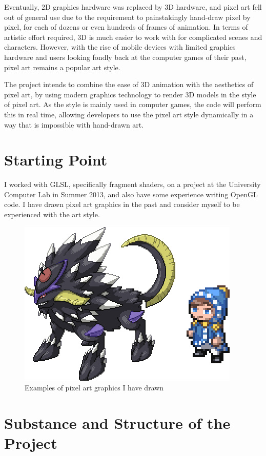 \documentclass[12pt]{article}
\begin{document}
Eventually, 2D graphics hardware was replaced by 3D hardware, and pixel art fell out of general use due to the requirement to painstakingly hand-draw pixel by pixel, for each of dozens or even hundreds of frames of animation. In terms of artistic effort required, 3D is much easier to work with for complicated scenes and characters. However, with the rise of mobile devices with limited graphics hardware and users looking fondly back at the computer games of their past, pixel art remains a popular art style.

The project intends to combine the ease of 3D animation with the aesthetics of pixel art, by using modern graphics technology to render 3D models in the style of pixel art. As the style is mainly used in computer games, the code will perform this in real time, allowing developers to use the pixel art style dynamically in a way that is impossible with hand-drawn art.

\section*{Starting Point}

I worked with GLSL, specifically fragment shaders, on a project at the University Computer Lab in Summer 2013, and also have some experience writing OpenGL code. I have drawn pixel art graphics in the past and consider myself to be experienced with the art style.

\begin{figure}[h!]
\centering
\includegraphics{examplesprite}
\caption{Examples of pixel art graphics I have drawn}
\end{figure}

\section*{Substance and Structure of the Project}
\end{document}
